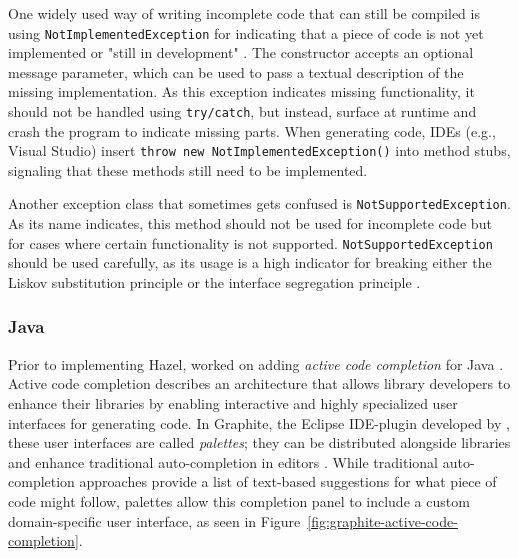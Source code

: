 \subsubsection{\CS}
One widely used way of writing incomplete \CS\-code that can still be compiled is using \texttt{NotImplementedException} \cite{microsoft_notimplementedexception_2020} for indicating that a piece of code is not yet implemented or "still in development" \cite{microsoft_notimplementedexception_2020}.
The constructor accepts an optional message parameter, which can be used to pass a textual description of the missing implementation.
As this exception indicates missing functionality, it should not be handled using \texttt{try/catch}, but instead, surface at runtime and crash the program to indicate missing parts.
When generating code, IDEs (e.g., Visual Studio) insert \texttt{throw new NotImplementedException()} into method stubs, signaling that these methods still need to be implemented.

Another exception class that sometimes gets confused is \texttt{NotSupportedException}.
As its name indicates, this method should not be used for incomplete code but for cases where certain functionality is not supported.
\texttt{NotSupportedException} should be used carefully, as its usage is a high indicator for breaking either the Liskov substitution principle or the interface segregation principle \cite{patrik_liskov_2017}.


\subsubsection{Java}
Prior to implementing Hazel, \citeauthor{omar_active_2012} worked on adding \emph{active code completion} for Java \cite{omar_active_2012}.
Active code completion describes an architecture that allows library developers to enhance their libraries by enabling interactive and highly specialized user interfaces for generating code.
In Graphite, the Eclipse IDE-plugin developed by \citeauthor{omar_active_2012}, these user interfaces are called \emph{palettes}; they can be distributed alongside libraries and enhance traditional auto-completion in editors \cite{omar_active_2012}.
While traditional auto-completion approaches provide a list of text-based suggestions for what piece of code might follow, palettes allow this completion panel to include a custom domain-specific user interface, as seen in Figure~\ref{fig:graphite-active-code-completion}.

